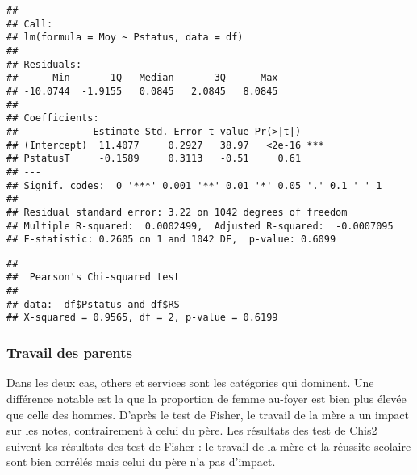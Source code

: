 \documentclass[
]{article}
\newenvironment{Shaded}{\begin{snugshade}}{\end{snugshade}}
\newcommand{\CommentTok}[1]{\textcolor[rgb]{0.56,0.35,0.01}{\textit{#1}}}
\newcommand{\FunctionTok}[1]{\textcolor[rgb]{0.00,0.00,0.00}{#1}}
\newcommand{\NormalTok}[1]{#1}
\newcommand{\SpecialCharTok}[1]{\textcolor[rgb]{0.00,0.00,0.00}{#1}}
\begin{document}
\begin{verbatim}
## 
## Call:
## lm(formula = Moy ~ Pstatus, data = df)
## 
## Residuals:
##      Min       1Q   Median       3Q      Max 
## -10.0744  -1.9155   0.0845   2.0845   8.0845 
## 
## Coefficients:
##             Estimate Std. Error t value Pr(>|t|)    
## (Intercept)  11.4077     0.2927   38.97   <2e-16 ***
## PstatusT     -0.1589     0.3113   -0.51     0.61    
## ---
## Signif. codes:  0 '***' 0.001 '**' 0.01 '*' 0.05 '.' 0.1 ' ' 1
## 
## Residual standard error: 3.22 on 1042 degrees of freedom
## Multiple R-squared:  0.0002499,  Adjusted R-squared:  -0.0007095 
## F-statistic: 0.2605 on 1 and 1042 DF,  p-value: 0.6099
\end{verbatim}

\begin{Shaded}
\end{Shaded}

\begin{verbatim}
## 
##  Pearson's Chi-squared test
## 
## data:  df$Pstatus and df$RS
## X-squared = 0.9565, df = 2, p-value = 0.6199
\end{verbatim}

\hypertarget{travail-des-parents}{%
\subsubsection{Travail des parents}\label{travail-des-parents}}

Dans les deux cas, others et services sont les catégories qui dominent.
Une différence notable est la que la proportion de femme au-foyer est
bien plus élevée que celle des hommes. D'après le test de Fisher, le
travail de la mère a un impact sur les notes, contrairement à celui du
père. Les résultats des test de Chis2 suivent les résultats des test de
Fisher : le travail de la mère et la réussite scolaire sont bien
corrélés mais celui du père n'a pas d'impact.
\end{document}
